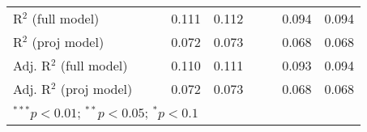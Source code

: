 \begin{sidewaystable}[h]
\begin{center}
{\begin{tabular}{l S[table-format=6.6] S[table-format=6.6] S[table-format=6.6] S[table-format=6.6] S[table-format=6.6] S[table-format=6.6] S[table-format=6.6] S[table-format=6.6]}
R$^2$ (full model)                  &              &              & 0.111        & 0.112        &              &              & 0.094        & 0.094        \\
R$^2$ (proj model)                  &              &              & 0.072        & 0.073        &              &              & 0.068        & 0.068        \\
Adj. R$^2$ (full model)             &              &              & 0.110        & 0.111        &              &              & 0.093        & 0.094        \\
Adj. R$^2$ (proj model)             &              &              & 0.072        & 0.073        &              &              & 0.068        & 0.068        \\
\bottomrule
{}
\end{tabular}}
\label{reg1}
\end{center}
\end{sidewaystable}